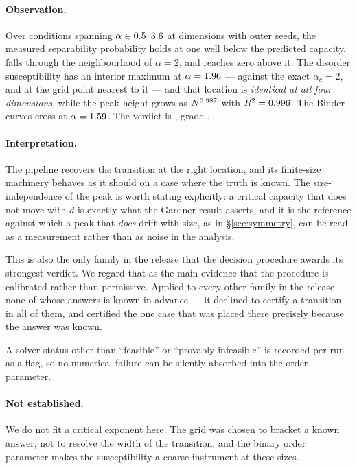 \paragraph{Observation.}
Over \AtlasPerceptronCapacityConditions{} conditions spanning
$\alpha\in0.5\text{--}3.6{}$ at
\AtlasPerceptronCapacitySizes{} dimensions with
\AtlasPerceptronCapacitySeeds{} outer seeds, the measured separability
probability holds at one well below the predicted capacity, falls through the
neighbourhood of $\alpha=2$, and reaches zero above it. The disorder
susceptibility has an interior maximum at
$\alpha=1.96{}$ --- against the exact
$\alpha_c=2$, and at the grid point nearest to it --- and that location is
\emph{identical at all four dimensions}, while the peak height grows as
$N^{0.987{}}$ with
$R^2=0.996{}$. The Binder curves cross at
$\alpha=1.59{}$. The verdict is
\emph{\AtlasPerceptronCapacityVerdict{}}, grade
\AtlasPerceptronCapacityGrade{}.

\paragraph{Interpretation.}
The pipeline recovers the transition at the right location, and its finite-size
machinery behaves as it should on a case where the truth is known. The
size-independence of the peak is worth stating explicitly: a critical capacity
that does not move with $d$ is exactly what the Gardner result asserts, and it
is the reference against which a peak that \emph{does} drift with size, as in
\S\ref{sec:symmetry}, can be read as a measurement rather than as noise in the
analysis.

This is also the only family in the release that the decision procedure awards
its strongest verdict. We regard that as the main evidence that the procedure
is calibrated rather than permissive. Applied to every other family in the
release --- none of whose answers is known in advance --- it declined to certify
a transition in all of them, and certified the one case that was placed there
precisely because the answer was known.

A solver status other than ``feasible'' or ``provably infeasible'' is recorded
per run as a flag, so no numerical failure can be silently absorbed into the
order parameter.

\paragraph{Not established.}
We do not fit a critical exponent here. The grid was chosen to bracket a known
answer, not to resolve the width of the transition, and the binary order
parameter makes the susceptibility a coarse instrument at these sizes.

